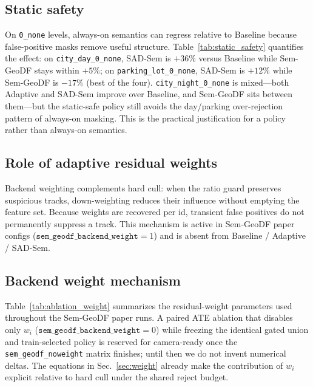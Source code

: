\documentclass{ieeeaccess}
\begin{document}
\subsection{Static safety}
\label{sec:staticsafe}
On \texttt{0\_none} levels, always-on semantics can regress relative to Baseline because false-positive masks remove useful structure.
Table~\ref{tab:static_safety} quantifies the effect: on \texttt{city\_day\_0\_none}, SAD-Sem is \(+36\%\) versus Baseline while Sem-GeoDF stays within \(+5\%\); on \texttt{parking\_lot\_0\_none}, SAD-Sem is \(+12\%\) while Sem-GeoDF is \(-17\%\) (best of the four).
\texttt{city\_night\_0\_none} is mixed---both Adaptive and SAD-Sem improve over Baseline, and Sem-GeoDF sits between them---but the static-safe policy still avoids the day/parking over-rejection pattern of always-on masking.
This is the practical justification for a policy rather than always-on semantics.



\subsection{Role of adaptive residual weights}
Backend weighting complements hard cull: when the ratio guard preserves suspicious tracks, down-weighting reduces their influence without emptying the feature set.
Because weights are recovered per id, transient false positives do not permanently suppress a track.
This mechanism is active in Sem-GeoDF paper configs (\(\texttt{sem\_geodf\_backend\_weight}{=}1\)) and is absent from Baseline / Adaptive / SAD-Sem.

\subsection{Backend weight mechanism}
\label{sec:ablation-weight}
Table~\ref{tab:ablation_weight} summarizes the residual-weight parameters used throughout the Sem-GeoDF paper runs.
A paired ATE ablation that disables only \(w_i\) (\(\texttt{sem\_geodf\_backend\_weight}{=}0\)) while freezing the identical gated union and train-selected policy is reserved for camera-ready once the \texttt{sem\_geodf\_noweight} matrix finishes; until then we do not invent numerical deltas.
The equations in Sec.~\ref{sec:weight} already make the contribution of \(w_i\) explicit relative to hard cull under the shared reject budget.


\end{document}
